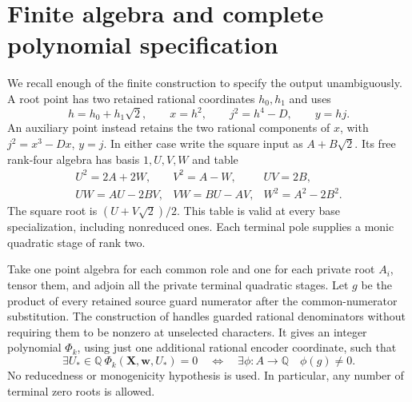 \documentclass[11pt]{article}
\newcommand{\Q}{\mathbb Q}
\begin{document}
\section{Finite algebra and complete polynomial specification}
\label{sec:polynomial}

We recall enough of the finite construction to specify the
output unambiguously. A root point has two retained rational
coordinates \(h_0,h_1\) and uses
\[
 h=h_0+h_1\sqrt2,\qquad x=h^2,\qquad
 j^2=h^4-D,\qquad y=hj.
\]
An auxiliary point instead retains the two rational components
of \(x\), with \(j^2=x^3-Dx\), \(y=j\).
In either case write the square input as \(A+B\sqrt2\).
Its free rank-four algebra has basis \(1,U,V,W\) and table
\[
\begin{array}{lll}
 U^2=2A+2W,& V^2=A-W,& UV=2B,\\
 UW=AU-2BV,& VW=BU-AV,& W^2=A^2-2B^2.
\end{array}
\]
The square root is \((U+V\sqrt2)/2\). This table is valid
at every base specialization, including nonreduced ones.
Each terminal pole supplies a monic quadratic stage of rank two.

Take one point algebra for each common role and one for each
private root \(A_i\), tensor them, and adjoin all the private
terminal quadratic stages. Let \(g\) be the product of every
retained source guard numerator after the common-numerator
substitution. The construction of \cite{shared} handles
guarded rational denominators without requiring them to be
nonzero at unselected characters. It gives an integer
polynomial \(\Phi_k\), using just one additional rational
encoder coordinate, such that
\[
 \exists U_*\in\Q\ \Phi_k(\mathbf X,\mathbf w,U_*)=0
 \quad\Longleftrightarrow\quad
 \exists\phi:A\longrightarrow\Q\quad\phi(g)\ne0 .
\]
No reducedness or monogenicity hypothesis is used. In particular,
any number of terminal zero roots is allowed.
\end{document}
